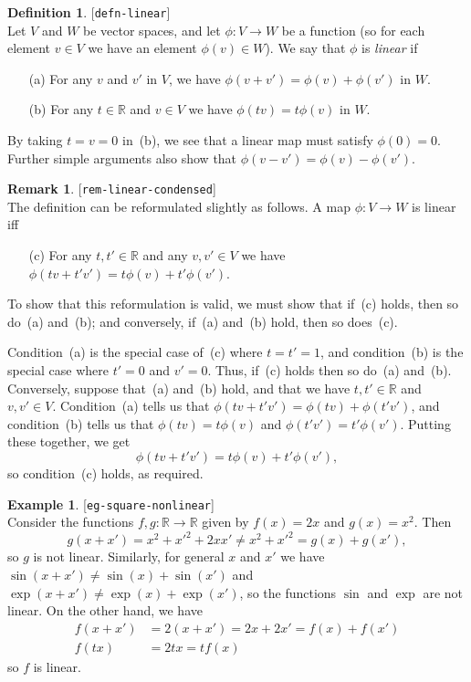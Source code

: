 \documentclass{amsart}
\newcommand{\lbl}[1]{\label{#1}\textup{[\texttt{#1}]}\ \\}
\newcommand{\lbl}{\label}
\newcommand{\R}         {{\mathbb{R}}}
\newcommand{\xra}       {\xrightarrow}
\renewcommand{\:}       {\colon}
\theoremstyle{definition}
\newtheorem{remark}[theorem]{Remark}
\newtheorem{definition}[theorem]{Definition}
\newtheorem{example}[theorem]{Example}
\begin{document}
\begin{definition}\lbl{defn-linear}
 Let $V$ and $W$ be vector spaces, and let $\phi\:V\xra{}W$ be a
 function (so for each element $v\in V$ we have an element
 $\phi(v)\in W$).  We say that $\phi$ is \emph{linear} if 
 \begin{itemize}
  \item[(a)] For any $v$ and $v'$ in $V$, we have
   $\phi(v+v')=\phi(v)+\phi(v')$ in $W$.
  \item[(b)] For any $t\in\R$ and $v\in V$ we have
   $\phi(tv)=t\phi(v)$ in $W$. 
 \end{itemize}
 By taking $t=v=0$ in~(b), we see that a linear map must satisfy
 $\phi(0)=0$.  Further simple arguments also show that
 $\phi(v-v')=\phi(v)-\phi(v')$.
\end{definition}
\begin{remark}\lbl{rem-linear-condensed}
 The definition can be reformulated slightly as follows.  A
 map $\phi\:V\to W$ is linear iff
 \begin{itemize}
  \item[(c)] For any $t,t'\in\R$ and any $v,v'\in V$ we have
   $\phi(tv+t'v')=t\phi(v)+t'\phi(v')$. 
 \end{itemize}
 To show that this reformulation is valid, we must show that
 if~(c) holds, then so do~(a) and~(b); and conversely,
 if~(a) and~(b) hold, then so does~(c).

 Condition~(a) is the special case of~(c) where $t=t'=1$, and
 condition~(b) is the special case where $t'=0$ and $v'=0$.
 Thus, if~(c) holds then so do~(a) and~(b).  Conversely,
 suppose that~(a) and~(b) hold, and that we have $t,t'\in\R$
 and $v,v'\in V$.  Condition~(a) tells us that
 $\phi(tv+t'v')=\phi(tv)+\phi(t'v')$, and condition~(b) tells
 us that $\phi(tv)=t\phi(v)$ and $\phi(t'v')=t'\phi(v')$.
 Putting these together, we get
 \[ \phi(tv+t'v')=t\phi(v)+t'\phi(v'), \]
 so condition~(c) holds, as required.
\end{remark}

\begin{example}\lbl{eg-square-nonlinear}
  Consider the functions $f,g\:\R\xra{}\R$ given by $f(x)=2x$ and
  $g(x)=x^2$.  Then
  \[ g(x+x') = x^2 + x'^2 + 2xx' \neq x^2 + x'^2 = g(x) + g(x'), \]
  so $g$ is not linear.  Similarly, for general $x$ and $x'$
  we have $\sin(x+x')\neq\sin(x)+\sin(x')$ and
  $\exp(x+x')\neq\exp(x)+\exp(x')$, so the functions $\sin$
  and $\exp$ are not linear.  On the other hand, we have
  \begin{align*}
    f(x+x') &= 2(x+x') = 2x + 2x' = f(x) + f(x') \\
    f(tx) &= 2tx = t f(x) 
  \end{align*}
  so $f$ is linear.
\end{example}
\end{document}
